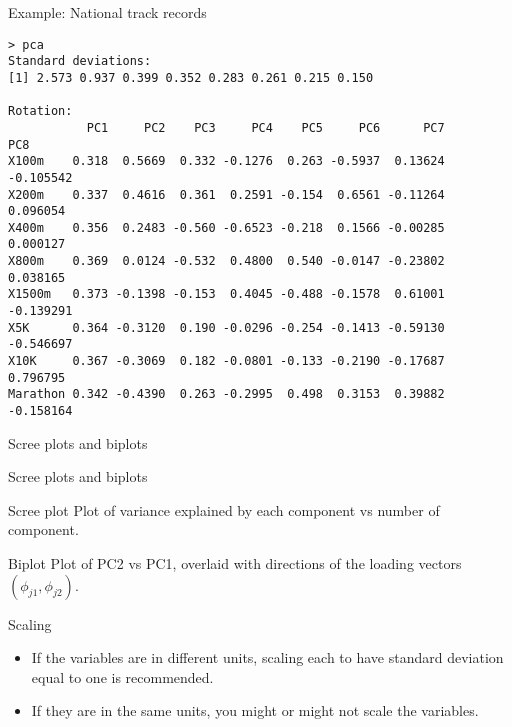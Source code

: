 \documentclass[14pt]{beamer}
\begin{document}
\begin{frame}[fragile]{\large Example: National track records}
\fontsize{9}{14}\sf

\begin{BVerbatim}
> pca
Standard deviations:
[1] 2.573 0.937 0.399 0.352 0.283 0.261 0.215 0.150

Rotation:
           PC1     PC2    PC3     PC4    PC5     PC6      PC7       PC8
X100m    0.318  0.5669  0.332 -0.1276  0.263 -0.5937  0.13624 -0.105542
X200m    0.337  0.4616  0.361  0.2591 -0.154  0.6561 -0.11264  0.096054
X400m    0.356  0.2483 -0.560 -0.6523 -0.218  0.1566 -0.00285  0.000127
X800m    0.369  0.0124 -0.532  0.4800  0.540 -0.0147 -0.23802  0.038165
X1500m   0.373 -0.1398 -0.153  0.4045 -0.488 -0.1578  0.61001 -0.139291
X5K      0.364 -0.3120  0.190 -0.0296 -0.254 -0.1413 -0.59130 -0.546697
X10K     0.367 -0.3069  0.182 -0.0801 -0.133 -0.2190 -0.17687  0.796795
Marathon 0.342 -0.4390  0.263 -0.2995  0.498  0.3153  0.39882 -0.158164
\end{BVerbatim}

\end{frame}


\begin{frame}{Scree plots and biplots}

\end{frame}

\begin{frame}{Scree plots and biplots}
\begin{block}{Scree plot}
Plot of variance explained by each component vs number of component.
\end{block}

\begin{block}{Biplot}
Plot of PC2 vs PC1, overlaid with directions of the loading vectors $(\phi_{j1},\phi_{j2})$.
\end{block}
\end{frame}

\begin{frame}{Scaling}

\begin{itemize}
\item If the variables are in different units, scaling each to have standard deviation equal to one is recommended.

\item If they are in the same units, you might or might not scale the variables.

\end{itemize}

\end{frame}
\end{document}
